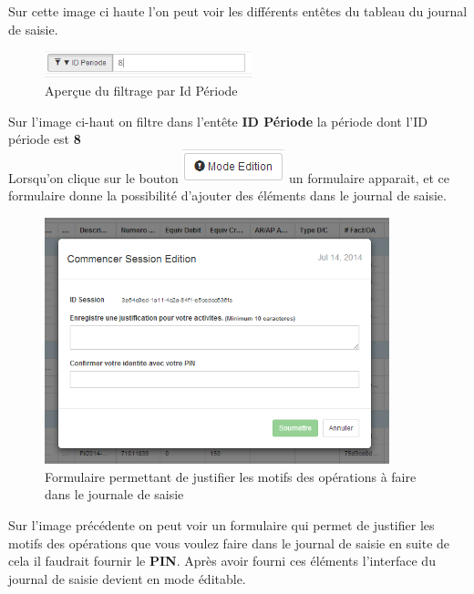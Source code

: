 \documentclass[12pt,a4paper]{report}
\begin{document}
Sur cette image ci haute l'on peut voir les différents entêtes du tableau du journal de saisie.

\begin{figure}[h]
\begin{center}
\includegraphics[width=6cm]{pic/FiltrageIdPeriode.png}
\end{center}
\caption{Aperçue du filtrage par Id Période}
\label{Aperçue du filtrage par Id Période}
\end{figure}

Sur l'image ci-haut on filtre dans l'entête \textbf{ID Période} la période dont l'ID période est \textbf{8 }
\\
\newpage
Lorsqu'on clique sur le bouton \includegraphics[scale=0.7]{pic/ModeEdition.png}  un formulaire apparait, et ce formulaire donne la possibilité d'ajouter des éléments dans le journal de saisie. 
\begin{figure}[h]
\begin{center}
\includegraphics[width=10cm]{pic/FigEdition.png}
\end{center}
\caption{Formulaire permettant de justifier les motifs des opérations à faire dans le journale de saisie}
\label{Formulaire permettant de justifier les motifs des opérations à faire dans le journale de saisie}
\end{figure}

Sur l'image précédente on peut voir un formulaire qui permet de justifier les motifs des opérations que vous voulez faire dans le journal de saisie en suite de cela il faudrait fournir le \textbf{PIN}.
Après avoir fourni ces éléments l'interface du journal de saisie devient en mode éditable.
 
\end{document}
